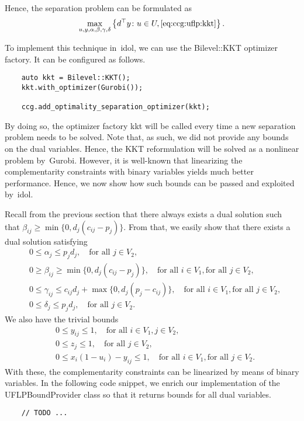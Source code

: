 Hence, the separation problem can be formulated as 
\begin{align*}
    \max_{u,y,\alpha,\beta,\gamma,\delta} \left\{ d^\top y \colon u\in U, \eqref{eq:ccg:uflp:kkt} \right\}.
\end{align*}

To implement this technique in~\textsf{idol}, we can use the
\textsf{Bilevel::KKT} optimizer factory. It can be configured as follows. 
%
\begin{lstlisting}
    auto kkt = Bilevel::KKT();
    kkt.with_optimizer(Gurobi());

    ccg.add_optimality_separation_optimizer(kkt);
\end{lstlisting}

By doing so, the optimizer factory \textsf{kkt} will be called every time a
new separation problem needs to be solved. Note that, as such, we did not
provide any bounds on the dual variables. Hence, the KKT reformulation will be
solved as a nonlinear problem by~\textsf{Gurobi}. However, it is well-known
that linearizing the complementarity constraints with binary variables yields
much better performance. Hence, we now show how such bounds can be passed and
exploited by~\textsf{idol}.

Recall from the previous section that there always exists a dual solution such
that $\beta_{ij} \ge \min\{ 0, d_j(c_{ij} - p_j) \}$. From that, we easily show that
there exists a dual solution satisfying
\begin{align*}
    & 0 \le \alpha_j \le p_jd_j, \quad \text{for all }j\in V_2, \\
    & 0 \ge \beta_{ij} \ge \min\{ 0, d_j(c_{ij} - p_j) \}, \quad \text{for all } i\in V_1, \text{for all } j\in V_2, \\
    & 0 \le \gamma_{ij} \le c_{ij}d_j + \max\{ 0, d_j( p_j - c_{ij} ) \}, \quad \text{for all } i\in V_1, \text{for all } j\in V_2, \\
    & 0 \le \delta_j \le p_jd_j, \quad \text{for all } j\in V_2.
\end{align*}
We also have the trivial bounds 
\begin{align*}
    & 0\le y_{ij} \le 1, \quad \text{for all } i\in V_1, j\in V_2, \\
    & 0\le z_j \le 1, \quad \text{for all } j\in V_2, \\
    & 0 \le x_i(1 - u_i) - y_{ij} \le 1 , \quad \text{for all } i\in V_1, \text{for all } j\in V_2.
\end{align*}
With these, the complementarity constraints can be linearized by means of
binary variables. In the following code snippet, we enrich our implementation
of the \textsf{UFLPBoundProvider} class so that it returns bounds for all dual
variables.
%
\begin{lstlisting}
    // TODO ...
\end{lstlisting}

